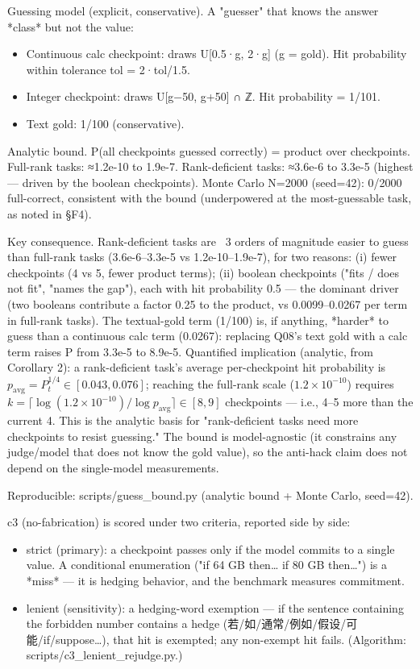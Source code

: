 \documentclass[10pt,twocolumn]{article}
\begin{document}
Guessing model (explicit, conservative). A "guesser" that knows the answer *class* but not the value:


\begin{itemize}
  \item Continuous calc checkpoint: draws U[0.5·g, 2·g] (g = gold). Hit probability within tolerance tol = 2·tol/1.5.
  \item Integer checkpoint: draws U[g−50, g+50] ∩ ℤ. Hit probability = 1/101.
  \item Text gold: 1/100 (conservative).
\end{itemize}


Analytic bound. P(all checkpoints guessed correctly) = product over checkpoints. Full-rank tasks: ≈1.2e-10 to 1.9e-7. Rank-deficient tasks: ≈3.6e-6 to 3.3e-5 (highest — driven by the boolean checkpoints). Monte Carlo N=2000 (seed=42): 0/2000 full-correct, consistent with the bound (underpowered at the most-guessable task, as noted in §F4).


Key consequence. Rank-deficient tasks are ~3 orders of magnitude easier to guess than full-rank tasks (3.6e-6–3.3e-5 vs 1.2e-10–1.9e-7), for two reasons: (i) fewer checkpoints (4 vs 5, fewer product terms); (ii) boolean checkpoints ("fits / does not fit", "names the gap"), each with hit probability 0.5 — the dominant driver (two booleans contribute a factor 0.25 to the product, vs 0.0099–0.0267 per term in full-rank tasks). The textual-gold term (1/100) is, if anything, *harder* to guess than a continuous calc term (0.0267): replacing Q08's text gold with a calc term raises P from 3.3e-5 to 8.9e-5. Quantified implication (analytic, from Corollary 2): a rank-deficient task's average per-checkpoint hit probability is $p_{\text{avg}} = P_t^{1/4} \in [0.043, 0.076]$; reaching the full-rank scale ($1.2\times10^{-10}$) requires $k = \lceil \log(1.2\times10^{-10})/\log p_{\text{avg}} \rceil \in [8, 9]$ checkpoints — i.e., 4–5 more than the current 4. This is the analytic basis for "rank-deficient tasks need more checkpoints to resist guessing." The bound is model-agnostic (it constrains any judge/model that does not know the gold value), so the anti-hack claim does not depend on the single-model measurements.


Reproducible: scripts/guess\_bound.py (analytic bound + Monte Carlo, seed=42).


c3 (no-fabrication) is scored under two criteria, reported side by side:


\begin{itemize}
  \item strict (primary): a checkpoint passes only if the model commits to a single value. A conditional enumeration ("if 64 GB then… if 80 GB then…") is a *miss* — it is hedging behavior, and the benchmark measures commitment.
  \item lenient (sensitivity): a hedging-word exemption — if the sentence containing the forbidden number contains a hedge (若/如/通常/例如/假设/可能/if/suppose…), that hit is exempted; any non-exempt hit fails. (Algorithm: scripts/c3\_lenient\_rejudge.py.)
\end{itemize}
\end{document}
